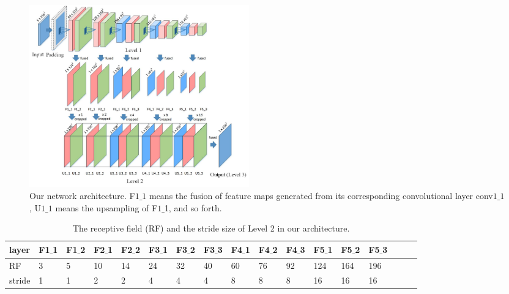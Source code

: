 \begin{figure}
\centering
\includegraphics[width=95mm]{figs/hierarchicalFCN-revision}
\caption{Our network architecture. F$1\_1$ means the fusion of feature maps generated from its corresponding convolutional layer conv$1\_1$, U$1\_1$ means the upsampling of F$1\_$1, and so forth.}
\label{fig:hierarchicalFCN}
\end{figure}

   \begin{table}	
	\centering 
	\caption{The receptive field (RF) and the stride size of Level 2 in our architecture.}	
 	\begin{tabular}{C{1cm}|*{16}{C{0.74cm}}} 
	\hline
	layer & F1$\_$1 & F1$\_$2  & F2$\_$1  & F2$\_$2  & F3$\_$1  & F3$\_$2  & F3$\_$3  & F4$\_$1  &   F4$\_$2  & F4$\_$3  & F5$\_$1 & F5$\_$2  &F5$\_$3 \\
	\hline
    RF & 3 & 5  & 10 & 14  & 24  & 32  & 40  & 60  & 76  & 92 & 124  & 164  & 196 \\
	\hline
	stride & 1 & 1   & 2  & 2  & 4  & 4  & 4  &8  & 8  & 8  & 16  & 16  & 16 \\
	\hline
    \end{tabular}
    \label{tab:receptivefield} 
   \end{table}         
    
